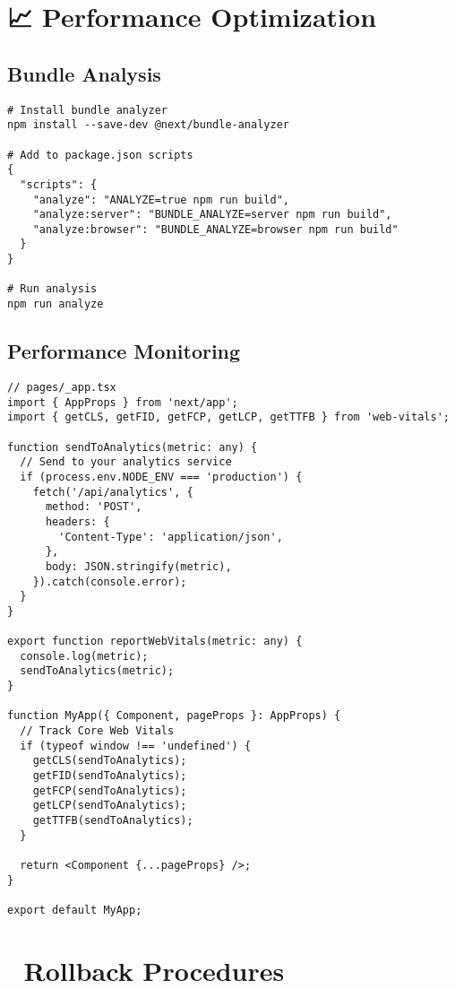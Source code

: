 \documentclass[11pt,a4paper]{article}
\begin{document}
\section{📈 Performance Optimization}

\subsection{Bundle Analysis}

\begin{lstlisting}[style=bash, caption=Bundle Analysis Setup]
# Install bundle analyzer
npm install --save-dev @next/bundle-analyzer

# Add to package.json scripts
{
  "scripts": {
    "analyze": "ANALYZE=true npm run build",
    "analyze:server": "BUNDLE_ANALYZE=server npm run build",
    "analyze:browser": "BUNDLE_ANALYZE=browser npm run build"
  }
}

# Run analysis
npm run analyze
\end{lstlisting}

\subsection{Performance Monitoring}

\begin{lstlisting}[style=bash, caption=Web Vitals Tracking]
// pages/_app.tsx
import { AppProps } from 'next/app';
import { getCLS, getFID, getFCP, getLCP, getTTFB } from 'web-vitals';

function sendToAnalytics(metric: any) {
  // Send to your analytics service
  if (process.env.NODE_ENV === 'production') {
    fetch('/api/analytics', {
      method: 'POST',
      headers: {
        'Content-Type': 'application/json',
      },
      body: JSON.stringify(metric),
    }).catch(console.error);
  }
}

export function reportWebVitals(metric: any) {
  console.log(metric);
  sendToAnalytics(metric);
}

function MyApp({ Component, pageProps }: AppProps) {
  // Track Core Web Vitals
  if (typeof window !== 'undefined') {
    getCLS(sendToAnalytics);
    getFID(sendToAnalytics);
    getFCP(sendToAnalytics);
    getLCP(sendToAnalytics);
    getTTFB(sendToAnalytics);
  }
  
  return <Component {...pageProps} />;
}

export default MyApp;
\end{lstlisting}

\section{🔄 Rollback Procedures}
\end{document}
